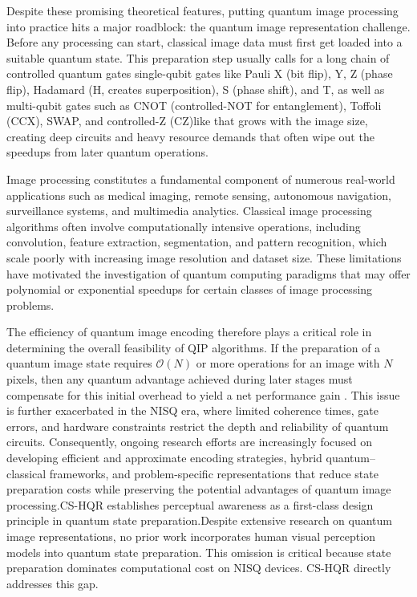 \documentclass[11pt,a4paper]{article}
\begin{document}
Despite these promising theoretical features, putting quantum image processing into practice hits a major roadblock: the quantum image representation challenge. Before any processing can start, classical image data must first get loaded into a suitable quantum state. This preparation step usually calls for a long chain of controlled quantum gates single-qubit gates like Pauli X (bit flip), Y, Z (phase flip), Hadamard (H, creates superposition), S (phase shift), and T, as well as multi-qubit gates such as CNOT (controlled-NOT for entanglement), Toffoli (CCX), SWAP, and controlled-Z (CZ)like that grows with the image size, creating deep circuits and heavy resource demands that often wipe out the speedups from later quantum operations\cite{ref15}.

Image processing constitutes a fundamental component of numerous real-world applications such as medical imaging, remote sensing, autonomous navigation, surveillance systems, and multimedia analytics. Classical image processing algorithms often involve computationally intensive operations, including convolution, feature extraction, segmentation, and pattern recognition, which scale poorly with increasing image resolution and dataset size. These limitations have motivated the investigation of quantum computing paradigms that may offer polynomial or exponential speedups for certain classes of image processing problems.

The efficiency of quantum image encoding therefore plays a critical role in determining the overall feasibility of QIP algorithms. If the preparation of a quantum image state requires $\mathcal{O}(N)$ or more operations for an image with $N$ pixels, then any quantum advantage achieved during later stages must compensate for this initial overhead to yield a net performance gain \cite{ref15}. This issue is further exacerbated in the NISQ era, where limited coherence times, gate errors, and hardware constraints restrict the depth and reliability of quantum circuits. Consequently, ongoing research efforts are increasingly focused on developing efficient and approximate encoding strategies, hybrid quantum--classical frameworks, and problem-specific representations that reduce state preparation costs while preserving the potential advantages of quantum image processing.CS-HQR establishes perceptual awareness as a first-class design principle in quantum state preparation.Despite extensive research on quantum image representations, no prior work incorporates human visual perception models into quantum state preparation. This omission is critical because state preparation dominates computational cost on NISQ devices. CS-HQR directly addresses this gap.
\end{document}
